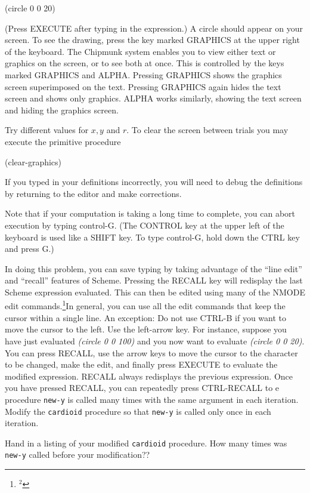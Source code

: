\beginlisp
	(circle 0 0 20)
\endlisp

(Press EXECUTE after typing in the expression.)  A circle should appear
on your screen.  To see the drawing, press the key marked GRAPHICS at the
upper right of the keyboard.  The Chipmunk system enables you to view
either text or graphics on the screen, or to see both at once.  This
is controlled by the keys marked GRAPHICS and ALPHA.  Pressing
GRAPHICS shows the graphics screen superimposed on the text.  Pressing
GRAPHICS again hides the text screen and shows only graphics.  ALPHA
works similarly, showing the text screen and hiding the graphics
screen.

Try different values for $x, y$ and $r$.   To clear the screen between trials you may execute
the primitive procedure

\beginlisp
(clear-graphics)
\endlisp


If you typed in your definitions incorrectly, you will need to debug the 
definitions by returning to the editor and make corrections.

Note that if your computation is taking a long time to complete, you can
abort
execution by typing control-G.  (The CONTROL key at the upper left
of the keyboard is used like a SHIFT key.  To type control-G, hold
down the CTRL key and press G.)

In doing this problem, you can save typing by taking advantage of the
``line edit'' and ``recall'' features of Scheme.  Pressing the
RECALL key will redisplay the last Scheme expression evaluated.
This can then be edited using many of the NMODE edit commands.\footnote{$^2$}{In
general, you can use all the edit commands that keep the cursor within
a single line.  An exception: Do not use CTRL-B if you want to
move the cursor to the left.  Use the left-arrow key.} For instance,
suppose you have just evaluated {\it (circle 0 0 100)} 
and you now want to evaluate {\it (circle 0 0 20)}.   You can press RECALL,
use the arrow keys to move the cursor to the character to be changed,
make the edit, and finally press EXECUTE to evaluate the modified
expression.  RECALL always redisplays the previous expression.
Once you have pressed RECALL, you can repeatedly press
CTRL-RECALL to e
procedure {\tt new-y} is called many times with the same argument in each
iteration.
Modify the {\tt cardioid} procedure so that {\tt new-y} is called only
once in each  iteration.

Hand in a listing of your modified {\tt cardioid} procedure.  How many
times was {\tt new-y} called before your modification??

